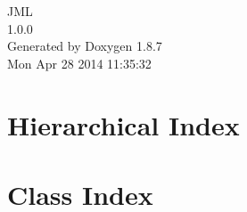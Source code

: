 \documentclass[twoside]{book}
\newcommand{\+}{\discretionary{\mbox{\scriptsize$\hookleftarrow$}}{}{}}
\newcommand{\clearemptydoublepage}{%
  \newpage{\pagestyle{empty}\cleardoublepage}%
}
\begin{document}
\hypersetup{pageanchor=false,
             bookmarks=true,
             bookmarksnumbered=true,
             pdfencoding=unicode
            }
\begin{titlepage}
\vspace*{7cm}
\begin{center}%
{\Large J\+M\+L \\[1ex]\large 1.\+0.\+0 }\\
\vspace*{1cm}
{\large Generated by Doxygen 1.8.7}\\
\vspace*{0.5cm}
{\small Mon Apr 28 2014 11:35:32}\\
\end{center}
\end{titlepage}
\clearemptydoublepage
\tableofcontents
\clearemptydoublepage
{}
\hypersetup{pageanchor=true}

\chapter{Hierarchical Index}

\chapter{Class Index}

\end{document}
